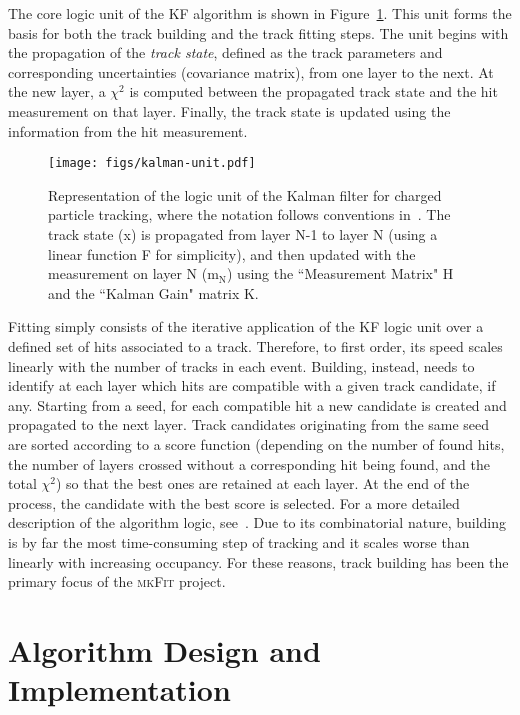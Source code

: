 \documentclass[a4paper,11pt]{article}
\newcommand{\mkFit}{\textsc{mkFit}\xspace}
\begin{document}
The core logic unit of the KF algorithm is shown in Figure~\ref{fig:kalman-unit}. This unit forms the basis for both the track building and the track fitting steps.
The unit begins with the propagation of the \emph{track state}, defined as the track parameters and corresponding uncertainties (covariance matrix), from one layer to the next. At the new layer, a $\chi^2$ is computed between the propagated track state and the hit measurement on that layer. Finally, the track state is updated using the information from the hit measurement. 

\begin{figure}[h]
\centering\texttt{[image: figs/kalman-unit.pdf]}
\caption{Representation of the logic unit of the Kalman filter for charged particle tracking, where the notation follows conventions in~\cite{Fruhwirth:1987fm}. The track state (x) is propagated from layer N-1 to layer N (using a linear function F for simplicity), and then updated with the measurement on layer N ($\mathrm{m_N}$) using the ``Measurement Matrix" H and the ``Kalman Gain" matrix K.}
\label{fig:kalman-unit}
\end{figure}

Fitting simply consists of the iterative application of the KF logic unit over a defined set of hits associated 
to a track. Therefore, to first order, its speed scales linearly with the number of tracks in each event.
Building, instead, needs to identify at each layer which hits are compatible with a given track candidate, if any.
Starting from a seed, for each compatible hit a new candidate is created and propagated to the next layer.
Track candidates originating from the same seed are sorted according to a score function (depending on the number of found hits, the number of layers crossed without a corresponding hit being found, and the total $\chi^2$) so that the best ones are retained at each layer. At the end of the process, the candidate with the best score is selected. For a more detailed description of the algorithm logic, see~\cite{Chatrchyan:2014fea}.
Due to its combinatorial nature, building is by far the most time-consuming step of tracking and it scales worse than linearly with increasing occupancy. For these reasons, track building has been the primary focus of the \mkFit project.

\section{Algorithm Design and Implementation}
\label{sec:algorithm}
\end{document}
